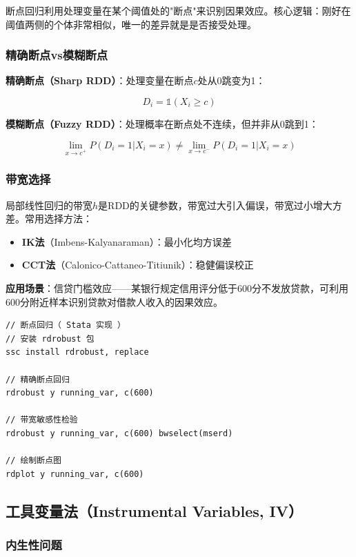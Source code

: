 断点回归利用处理变量在某个阈值处的"断点"来识别因果效应。核心逻辑：刚好在阈值两侧的个体非常相似，唯一的差异就是是否接受处理。

\subsubsection{精确断点vs模糊断点}

\textbf{精确断点（Sharp RDD）}：处理变量在断点$c$处从0跳变为1：

\[
D_i = \mathbb{1}(X_i \geq c)
\]

\textbf{模糊断点（Fuzzy RDD）}：处理概率在断点处不连续，但并非从0跳到1：

\[
\lim_{x \to c^+} P(D_i=1|X_i=x) \neq \lim_{x \to c^-} P(D_i=1|X_i=x)
\]

\subsubsection{带宽选择}

局部线性回归的带宽$h$是RDD的关键参数，带宽过大引入偏误，带宽过小增大方差。常用选择方法：

\begin{itemize}[leftmargin=2em]
  \item \textbf{IK法}（Imbens-Kalyanaraman）：最小化均方误差
  \item \textbf{CCT法}（Calonico-Cattaneo-Titiunik）：稳健偏误校正
\end{itemize}

\textbf{应用场景}：信贷门槛效应——某银行规定信用评分低于600分不发放贷款，可利用600分附近样本识别贷款对借款人收入的因果效应。

\begin{lstlisting}[style=stata]
// 断点回归（ Stata 实现 ）
// 安装 rdrobust 包
ssc install rdrobust, replace

// 精确断点回归
rdrobust y running_var, c(600)

// 带宽敏感性检验
rdrobust y running_var, c(600) bwselect(mserd)

// 绘制断点图
rdplot y running_var, c(600)
\end{lstlisting}

\subsection{工具变量法（Instrumental Variables, IV）}

\subsubsection{内生性问题}

